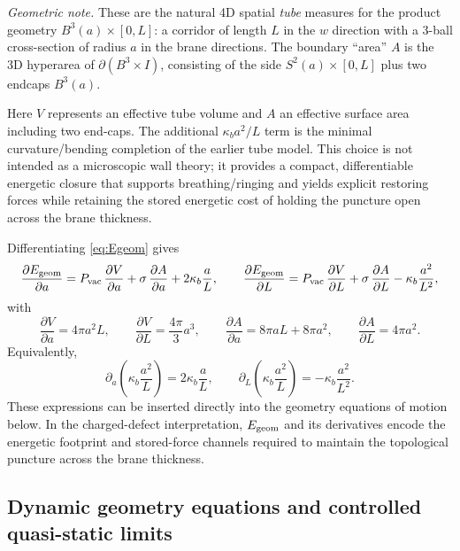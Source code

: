\documentclass[11pt]{article}
\newcommand{\kappab}{\kappa_b}
\begin{document}
\noindent\emph{Geometric note.} These are the natural 4D spatial \emph{tube} measures for the product geometry $B^3(a)\times[0,L]$: a corridor of length $L$ in the $w$ direction with a 3-ball cross-section of radius $a$ in the brane directions. The boundary ``area'' $A$ is the 3D hyperarea of $ \partial(B^3\times I)$, consisting of the side $S^2(a)\times[0,L]$ plus two endcaps $B^3(a)$.

Here $V$ represents an effective tube volume and $A$ an effective surface area including two end-caps. The additional $\kappab a^2/L$ term is the minimal curvature/bending completion of the earlier tube model. This choice is not intended as a microscopic wall theory; it provides a compact, differentiable energetic closure that supports breathing/ringing and yields explicit restoring forces while retaining the stored energetic cost of holding the puncture open across the brane thickness.

Differentiating \eqref{eq:Egeom} gives
\begin{equation}
\frac{\partial E_{\rm geom}}{\partial a}
=
P_{\rm vac}\,\frac{\partial V}{\partial a}
+
\sigma\,\frac{\partial A}{\partial a}
+
2\kappab\frac{a}{L},
\qquad
\frac{\partial E_{\rm geom}}{\partial L}
=
P_{\rm vac}\,\frac{\partial V}{\partial L}
+
\sigma\,\frac{\partial A}{\partial L}
-
\kappab\frac{a^2}{L^2},
\end{equation}
with
\begin{equation}
\frac{\partial V}{\partial a}=4\pi a^2 L,
\qquad
\frac{\partial V}{\partial L}=\frac{4\pi}{3}a^3,
\qquad
\frac{\partial A}{\partial a}=8\pi a L + 8\pi a^2,
\qquad
\frac{\partial A}{\partial L}=4\pi a^2.
\end{equation}
Equivalently,
\begin{equation}
\partial_a\!\left(\kappab\frac{a^2}{L}\right)=2\kappab\frac{a}{L},
\qquad
\partial_L\!\left(\kappab\frac{a^2}{L}\right)=-\kappab\frac{a^2}{L^2}.
\end{equation}
These expressions can be inserted directly into the geometry equations of motion below. In the charged-defect interpretation, $E_{\rm geom}$ and its derivatives encode the energetic footprint and stored-force channels required to maintain the topological puncture across the brane thickness.

\subsection{Dynamic geometry equations and controlled quasi-static limits}
\label{sec:geometry-dynamics}
\end{document}
